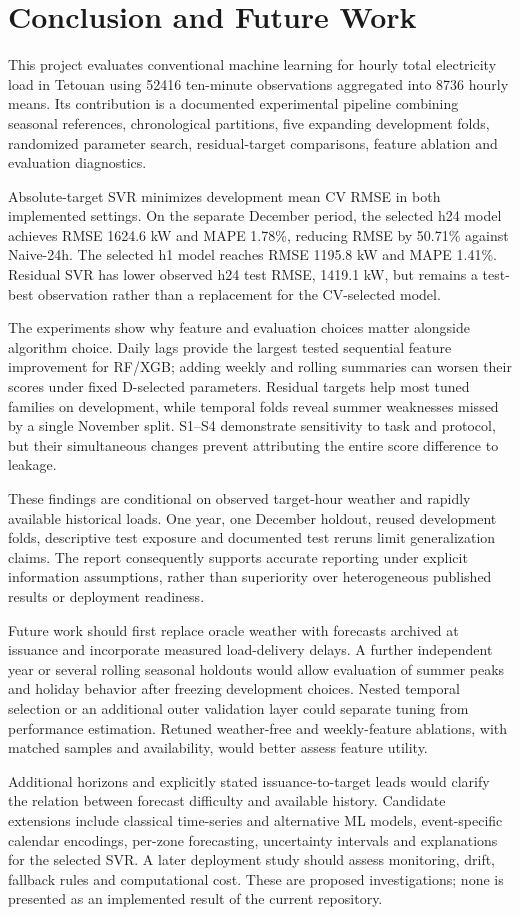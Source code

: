 \section{Conclusion and Future Work}\label{sec:conclusion}
This project evaluates conventional machine learning for hourly total electricity load in Tetouan using \num{52416} ten-minute observations aggregated into \num{8736} hourly means. Its contribution is a documented experimental pipeline combining seasonal references, chronological partitions, five expanding development folds, randomized parameter search, residual-target comparisons, feature ablation and evaluation diagnostics.

Absolute-target SVR minimizes development mean CV RMSE in both implemented settings. On the separate December period, the selected h24 model achieves RMSE \num{1624.6} kW and MAPE \num{1.78}\%, reducing RMSE by \num{50.71}\% against Naive-24h. The selected h1 model reaches RMSE \num{1195.8} kW and MAPE \num{1.41}\%. Residual SVR has lower observed h24 test RMSE, \num{1419.1} kW, but remains a test-best observation rather than a replacement for the CV-selected model.

The experiments show why feature and evaluation choices matter alongside algorithm choice. Daily lags provide the largest tested sequential feature improvement for RF/XGB; adding weekly and rolling summaries can worsen their scores under fixed D-selected parameters. Residual targets help most tuned families on development, while temporal folds reveal summer weaknesses missed by a single November split. S1--S4 demonstrate sensitivity to task and protocol, but their simultaneous changes prevent attributing the entire score difference to leakage.

These findings are conditional on observed target-hour weather and rapidly available historical loads. One year, one December holdout, reused development folds, descriptive test exposure and documented test reruns limit generalization claims. The report consequently supports accurate reporting under explicit information assumptions, rather than superiority over heterogeneous published results or deployment readiness.

Future work should first replace oracle weather with forecasts archived at issuance and incorporate measured load-delivery delays. A further independent year or several rolling seasonal holdouts would allow evaluation of summer peaks and holiday behavior after freezing development choices. Nested temporal selection or an additional outer validation layer could separate tuning from performance estimation. Retuned weather-free and weekly-feature ablations, with matched samples and availability, would better assess feature utility.

Additional horizons and explicitly stated issuance-to-target leads would clarify the relation between forecast difficulty and available history. Candidate extensions include classical time-series and alternative ML models, event-specific calendar encodings, per-zone forecasting, uncertainty intervals and explanations for the selected SVR. A later deployment study should assess monitoring, drift, fallback rules and computational cost. These are proposed investigations; none is presented as an implemented result of the current repository.
